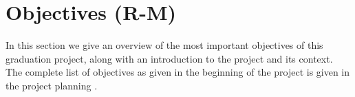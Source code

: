 
\section{Objectives (R-M)}
\label{sec:objectives}
In this section we give an overview of the most important objectives of this graduation project, along with an introduction to the project and its context.
The complete list of objectives as given in the beginning of the project is given in the project planning .




